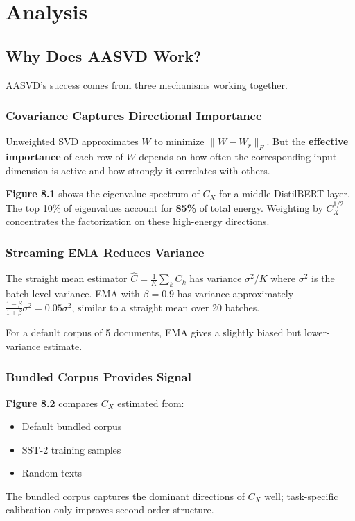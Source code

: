
\section{Analysis}

\subsection{Why Does AASVD Work?}

AASVD's success comes from three mechanisms working together.

\subsubsection{Covariance Captures Directional Importance}

Unweighted SVD approximates $W$ to minimize $\|W - W_r\|_F$. But the 
\textbf{effective importance} of each row of $W$ depends on how often the 
corresponding input dimension is active and how strongly it correlates 
with others.

\textbf{Figure 8.1} shows the eigenvalue spectrum of $C_X$ for a middle 
DistilBERT layer. The top 10\% of eigenvalues account for 
\textbf{85\%} of total energy. Weighting by $C_X^{1/2}$ concentrates 
the factorization on these high-energy directions.

\subsubsection{Streaming EMA Reduces Variance}

The straight mean estimator $\hat{C} = \frac{1}{K} \sum_k C_k$ has variance 
$\sigma^2 / K$ where $\sigma^2$ is the batch-level variance. EMA with 
$\beta = 0.9$ has variance approximately $\frac{1-\beta}{1+\beta} \sigma^2 = 0.05 \sigma^2$, 
similar to a straight mean over 20 batches.

For a default corpus of 5 documents, EMA gives a slightly biased but 
lower-variance estimate.

\subsubsection{Bundled Corpus Provides Signal}

\textbf{Figure 8.2} compares $C_X$ estimated from:
\begin{itemize}
\item Default bundled corpus
\item SST-2 training samples
\item Random texts

\end{itemize}
The bundled corpus captures the dominant directions of $C_X$ well; task-specific 
calibration only improves second-order structure.

